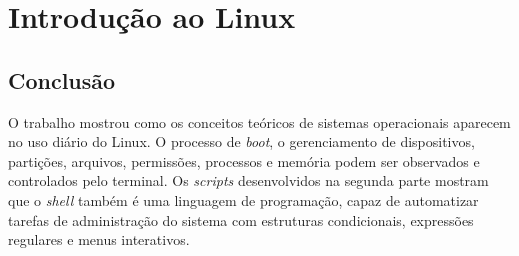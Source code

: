 \documentclass[12pt, a4paper, oneside, openany, chapter=TITLE, subsection=TITLE, section=TITLE, subsubsection=TITLE, subsubsubsection=TITLE, english, german, brazil]{abntex2}
\begin{document}
\part{Introdução ao Linux}\label{parte:linux}



\chapter*[Conclusão]{Conclusão}

O trabalho mostrou como os conceitos teóricos de sistemas operacionais aparecem no uso
diário do Linux. O processo de \textit{boot}, o gerenciamento de dispositivos, partições,
arquivos, permissões, processos e memória podem ser observados e controlados pelo
terminal. Os \textit{scripts} desenvolvidos na segunda parte mostram que o \textit{shell}
também é uma linguagem de programação, capaz de automatizar tarefas de administração
do sistema com estruturas condicionais, expressões regulares e menus interativos.


\postextual %


\end{document}
